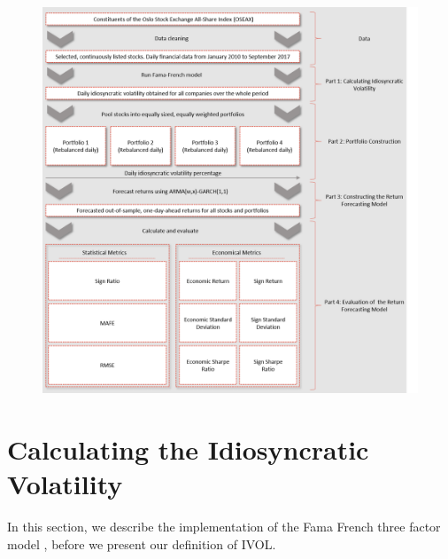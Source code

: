 \begin{figure}
    \centering
    \includegraphics[scale=0.5]{Pictures/FlowChart.png}
    \label{FlowChart}
\end{figure}

\newpage
\section{Calculating the Idiosyncratic Volatility}

In this section, we describe the implementation of the Fama French three factor model \cite{famafrench}, before we present our definition of IVOL.


